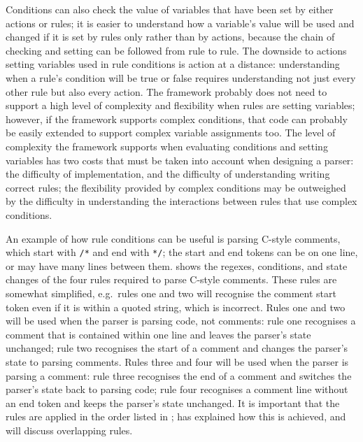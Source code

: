 Conditions can also check the value of variables that have been set by
either actions or rules; it is easier to understand how a variable's value
will be used and changed if it is set by rules only rather than by actions,
because the chain of checking and setting can be followed from rule to
rule.  The downside to actions setting variables used in rule conditions is
action at a distance: understanding when a rule's condition will be true or
false requires understanding not just every other rule but also every
action.  The framework probably does not need to support a high level of
complexity and flexibility when rules are setting variables; however, if
the framework supports complex conditions, that code can probably be easily
extended to support complex variable assignments too.  The level of
complexity the framework supports when evaluating conditions and setting
variables has two costs that must be taken into account when designing a
parser: the difficulty of implementation, and the difficulty of
understanding writing correct rules; the flexibility provided by complex
conditions may be outweighed by the difficulty in understanding the
interactions between rules that use complex conditions.

An example of how rule conditions can be useful is parsing C-style
comments, which start with \texttt{/*} and end with \texttt{*/}; the start
and end tokens can be on one line, or may have many lines between them.
 shows the regexes, conditions,
and state changes of the four rules required to parse C-style comments.
These rules are somewhat simplified, e.g.\ rules one and two will recognise
the comment start token even if it is within a quoted string, which is
incorrect.  Rules one and two will be used when the parser is parsing code,
not comments: rule one recognises a comment that is contained within one
line and leaves the parser's state unchanged; rule two recognises the start
of a comment and changes the parser's state to parsing comments.  Rules
three and four will be used when the parser is parsing a comment: rule
three recognises the end of a comment and switches the parser's state back
to parsing code; rule four recognises a comment line without an end token
and keeps the parser's state unchanged.  It is important that the rules are
applied in the order listed in ;
 has explained how this is achieved, and
 will discuss overlapping
rules.

